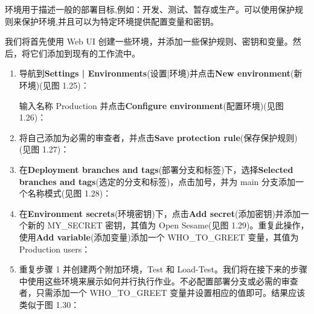 
环境用于描述一般的部署目标,例如：开发、测试、暂存或生产。可以使用保护规则来保护环境,并且可以为特定环境提供配置变量和密钥。


我们将首先使用 Web UI 创建一些环境，并添加一些保护规则、密钥和变量。然后，将它们添加到现有的工作流中。


\begin{enumerate}
\item 
导航到\textbf{Settings | Environments}(设置|环境)并点击\textbf{New environment}(新环境)(见图 1.25)：


输入名称 Production 并点击\textbf{Configure environment}(配置环境)(见图 1.26)：


\item 
将自己添加为必需的审查者，并点击\textbf{Save protection rule}(保存保护规则)(见图 1.27)：


\item 
在\textbf{Deployment branches and tags}(部署分支和标签)下，选择\textbf{Selected branches and tags}(选定的分支和标签)，点击加号，并为 main 分支添加一个名称模式(见图 1.28)：


\item 
在\textbf{Environment secrets}(环境密钥)下，点击\textbf{Add secret}(添加密钥)并添加一个新的 MY\_SECRET 密钥，其值为 Open Sesame(见图 1.29)。重复此操作，使用\textbf{Add variable}(添加变量)添加一个 WHO\_TO\_GREET 变量，其值为 Production users：


\item 
重复步骤 1 并创建两个附加环境，Test 和 Load-Test。我们将在接下来的步骤中使用这些环境来展示如何并行执行作业。不必配置部署分支或必需的审查者，只需添加一个 WHO\_TO\_GREET 变量并设置相应的值即可。结果应该类似于图 1.30：



\end{enumerate}
